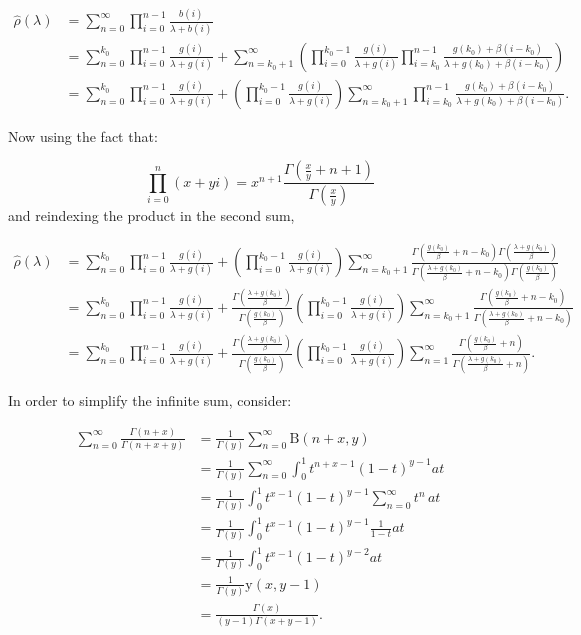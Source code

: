 \documentclass[
  sn-basic,
]{sn-jnl}
\theoremstyle{plain}
\theoremstyle{plain}
\theoremstyle{remark}
\begin{document}
\begin{align*}
\hat\rho(\lambda) &= \sum_{n=0}^\infty\prod_{i=0}^{n-1}\frac{b(i)}{\lambda+b(i)}\\ &= \sum_{n=0}^{k_0}\prod_{i=0}^{n-1}\frac{g(i)}{\lambda+g(i)} + \sum_{n=k_0+1}^\infty\left(\prod_{i=0}^{k_0-1}\frac{g(i)}{\lambda+g(i)}\prod_{i=k_0}^{n-1}\frac{g(k_0) + \beta(i-k_0)}{\lambda +g(k_0) + \beta(i-k_0)}\right)\\
&=\sum_{n=0}^{k_0}\prod_{i=0}^{n-1}\frac{g(i)}{\lambda+g(i)} + \left(\prod_{i=0}^{k_0-1}\frac{g(i)}{\lambda+g(i)}\right)\sum_{n=k_0+1}^\infty\prod_{i=k_0}^{n-1}\frac{g(k_0) + \beta(i-k_0)}{\lambda +g(k_0) + \beta(i-k_0)}.
\end{align*}

Now using the fact that:

\[
\prod_{i=0}^n(x+yi) = x^{n+1}\frac{\Gamma\left(\frac{x}{y}+n+1\right)}{\Gamma\left(\frac{x}{y}\right)}
\] and reindexing the product in the second sum,

\begin{align*}
\hat\rho(\lambda) &= \sum_{n=0}^{k_0}\prod_{i=0}^{n-1}\frac{g(i)}{\lambda+g(i)} + \left(\prod_{i=0}^{k_0-1}\frac{g(i)}{\lambda+g(i)}\right)\sum_{n=k_0+1}^\infty\frac{\Gamma\left(\frac{g(k_0)}{\beta}+n-k_0\right)\Gamma\left(\frac{\lambda+g(k_0)}{\beta}\right)}{\Gamma\left(\frac{\lambda+g(k_0)}{\beta}+n-k_0\right)\Gamma\left(\frac{g(k_0)}{\beta}\right)}\\
&= \sum_{n=0}^{k_0}\prod_{i=0}^{n-1}\frac{g(i)}{\lambda+g(i)} + \frac{\Gamma\left(\frac{\lambda+g(k_0)}{\beta}\right)}{\Gamma\left(\frac{g(k_0)}{\beta}\right)}\left(\prod_{i=0}^{k_0-1}\frac{g(i)}{\lambda+g(i)}\right)\sum_{n=k_0+1}^\infty\frac{\Gamma\left(\frac{g(k_0)}{\beta}+n-k_0\right)}{\Gamma\left(\frac{\lambda+g(k_0)}{\beta}+n-k_0\right)}\\
&=\sum_{n=0}^{k_0}\prod_{i=0}^{n-1}\frac{g(i)}{\lambda+g(i)} + \frac{\Gamma\left(\frac{\lambda+g(k_0)}{\beta}\right)}{\Gamma\left(\frac{g(k_0)}{\beta}\right)}\left(\prod_{i=0}^{k_0-1}\frac{g(i)}{\lambda+g(i)}\right)\sum_{n=1}^\infty\frac{\Gamma\left(\frac{g(k_0)}{\beta}+n\right)}{\Gamma\left(\frac{\lambda+g(k_0)}{\beta}+n\right)}.
\end{align*}

In order to simplify the infinite sum, consider:

\begin{align*}
\sum_{n=0}^\infty\frac{\Gamma(n+x)}{\Gamma(n+x+y)} &=\frac{1}{\Gamma(y)}\sum_{n=0}^\infty \text{B}(n+x,y)\\
&=\frac{1}{\Gamma(y)}\sum_{n=0}^\infty\int_0^1t^{n+x-1}(1-t)^{y-1}at\\
&=\frac{1}{\Gamma(y)}\int_0^1 t^{x-1}(1-t)^{y-1}\sum_{n=0}^\infty t^n\,at\\
&=\frac{1}{\Gamma(y)}\int_0^1 t^{x-1}(1-t)^{y-1}\frac{1}{1-t}at\\
&=\frac{1}{\Gamma(y)}\int_0^1 t^{x-1}(1-t)^{y-2}at\\
&=\frac{1}{\Gamma(y)}\text{y}(x,y-1)\\
&= \frac{\Gamma(x)}{(y-1)\Gamma(x+y-1)}.
\end{align*}
\end{document}
